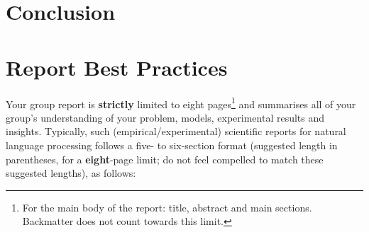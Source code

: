 \documentclass[11pt]{article}
\begin{document}
\section{Conclusion}

\newpage
\section{Report Best Practices}
\label{s:best}

Your group report is {\bf strictly} limited to eight pages\footnote{For the main body of the report: title, abstract and main sections. Backmatter does not count towards this limit.} and summarises all of your group's understanding of your problem, models, experimental results and insights.  Typically, such (empirical/experimental) scientific reports for natural language processing follows a five- to six-section format ({}suggested length in parentheses, for a {\bf eight}-page limit; do not feel compelled to match these suggested lengths), as follows:
\end{document}
